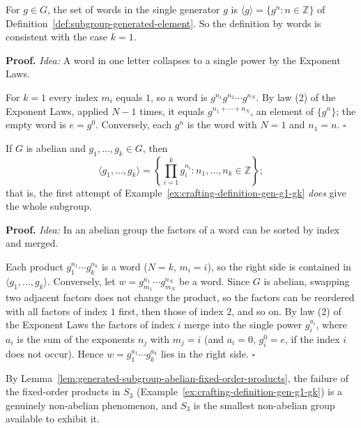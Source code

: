 \documentclass[11pt]{report}
\renewenvironment{proof}[1][Proof]{\noindent\textbf{#1.} }{\hfill$\square$\par\vspace{5pt}}
\begin{document}
\begin{lembox}\label{lem:words-single-generator-collapse}
For $g \in G$, the set of words in the single generator $g$ is $\langle g \rangle = \{g^n : n \in \mathbb{Z}\}$ of Definition~\ref{def:subgroup-generated-element}. So the definition by words is consistent with the case $k = 1$.
\end{lembox}

\begin{proof}
\textit{Idea:} A word in one letter collapses to a single power by the Exponent Laws.\par
For $k = 1$ every index $m_i$ equals $1$, so a word is $g^{n_1} g^{n_2} \cdots g^{n_N}$. By law (2) of the Exponent Laws, applied $N - 1$ times, it equals $g^{n_1 + \cdots + n_N}$, an element of $\{g^n\}$; the empty word is $e = g^0$. Conversely, each $g^n$ is the word with $N = 1$ and $n_1 = n$.
\end{proof}

\begin{lembox}\label{lem:generated-subgroup-abelian-fixed-order-products}
If $G$ is abelian and $g_1, \ldots, g_k \in G$, then
\[ \langle g_1, \ldots, g_k \rangle = \left\{ \prod_{i=1}^{k} g_i^{n_i} : n_1, \ldots, n_k \in \mathbb{Z} \right\}; \]
that is, the first attempt of Example~\ref{ex:crafting-definition-gen-g1-gk} \emph{does} give the whole subgroup.
\end{lembox}

\begin{proof}
\textit{Idea:} In an abelian group the factors of a word can be sorted by index and merged.\par
Each product $g_1^{n_1} \cdots g_k^{n_k}$ is a word ($N = k$, $m_i = i$), so the right side is contained in $\langle g_1, \ldots, g_k \rangle$. Conversely, let $w = g_{m_1}^{n_1} \cdots g_{m_N}^{n_N}$ be a word. Since $G$ is abelian, swapping two adjacent factors does not change the product, so the factors can be reordered with all factors of index $1$ first, then those of index $2$, and so on. By law (2) of the Exponent Laws the factors of index $i$ merge into the single power $g_i^{a_i}$, where $a_i$ is the sum of the exponents $n_j$ with $m_j = i$ (and $a_i = 0$, $g_i^0 = e$, if the index $i$ does not occur). Hence $w = g_1^{a_1} \cdots g_k^{a_k}$ lies in the right side.
\end{proof}

\begin{rembox}\label{rem:fixed-order-products-non-abelian-failure}
By Lemma~\ref{lem:generated-subgroup-abelian-fixed-order-products}, the failure of the fixed-order products in $S_3$ (Example~\ref{ex:crafting-definition-gen-g1-gk}) is a genuinely non-abelian phenomenon, and $S_3$ is the smallest non-abelian group available to exhibit it.
\end{rembox}
\end{document}

